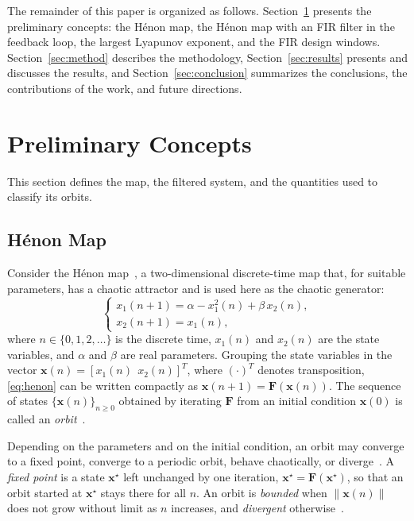 \documentclass[journal]{IEEEtran}
\begin{document}
The remainder of this paper is organized as follows.
Section~\ref{sec:prelim} presents the preliminary concepts: the H\'enon map,
the H\'enon map with an FIR filter in the feedback loop, the largest Lyapunov
exponent, and the FIR design windows. Section~\ref{sec:method} describes the methodology,
Section~\ref{sec:results} presents and discusses the results, and
Section~\ref{sec:conclusion} summarizes the conclusions, the contributions of
the work, and future directions.

\section{Preliminary Concepts}\label{sec:prelim}
This section defines the map, the filtered system, and the quantities used to classify
its orbits.

\subsection{H\'enon Map}\label{sub:henon}
Consider the H\'enon map~\cite{Henon1976}, a two-dimensional discrete-time map that,
for suitable parameters, has a chaotic attractor and is used here as the chaotic
generator:
\begin{equation}
  \begin{cases}
    x_1(n+1) = \alpha - x_1^2(n) + \beta\, x_2(n), \\
    x_2(n+1) = x_1(n),
  \end{cases}
  \label{eq:henon}
\end{equation}
where $n\in\{0,1,2,\ldots\}$ is the discrete time, $x_1(n)$ and $x_2(n)$ are
the state variables, and $\alpha$ and $\beta$ are real parameters. Grouping
the state variables in the vector $\mathbf{x}(n)=[x_1(n)\;\,x_2(n)]^{T}$,
where $(\cdot)^{T}$ denotes transposition, \eqref{eq:henon} can be written
compactly as $\mathbf{x}(n+1)=\mathbf{F}(\mathbf{x}(n))$. The sequence of
states $\{\mathbf{x}(n)\}_{n\ge 0}$ obtained by iterating $\mathbf{F}$ from an
initial condition $\mathbf{x}(0)$ is called an \emph{orbit}~\cite{Alligood1996}.

Depending on the parameters and on the initial condition, an orbit may
converge to a fixed point, converge to a periodic orbit, behave chaotically,
or diverge~\cite{Alligood1996}. A \emph{fixed point} is a state
$\mathbf{x}^\star$ left unchanged by one iteration,
$\mathbf{x}^\star=\mathbf{F}(\mathbf{x}^\star)$, so that an orbit started at
$\mathbf{x}^\star$ stays there for all $n$. An orbit is \emph{bounded} when $\|\mathbf{x}(n)\|$ does not grow without limit as $n$
increases, and \emph{divergent} otherwise~\cite{Alligood1996}.
\end{document}
